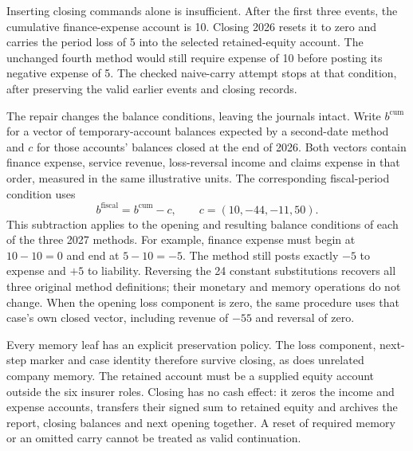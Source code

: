 Inserting closing commands alone is insufficient. After the first three
events, the cumulative finance-expense account is 10. Closing 2026 resets it
to zero and carries the period loss of 5 into the selected retained-equity
account. The unchanged fourth method would still require expense of 10 before
posting its negative expense of 5. The checked naive-carry attempt stops at
that condition, after preserving the valid earlier events and closing records.

The repair changes the balance conditions, leaving the journals intact. Write
$b^{\mathrm{cum}}$ for a vector of temporary-account balances expected by a
second-date method and $c$ for those accounts' balances closed at the end of
2026. Both vectors contain finance expense, service revenue, loss-reversal
income and claims expense in that order, measured in the same illustrative
units. The corresponding fiscal-period condition uses
\[
 b^{\mathrm{fiscal}}=b^{\mathrm{cum}}-c,
 \qquad c=(10,-44,-11,50).
\]
This subtraction applies to the opening and resulting balance conditions of
each of the three 2027 methods. For example, finance expense must begin at
$10-10=0$ and end at $5-10=-5$. The method still posts exactly $-5$ to expense
and $+5$ to liability. Reversing the 24 constant substitutions recovers all
three original method definitions; their monetary and memory operations do
not change. When the opening loss component is zero, the same procedure uses
that case's own closed vector, including revenue of $-55$ and reversal of zero.

Every memory leaf has an explicit preservation policy. The loss component,
next-step marker and case identity therefore survive closing, as does unrelated
company memory. The retained account must be a supplied equity account outside
the six insurer roles. Closing has no cash effect: it zeros the income and
expense accounts, transfers their signed sum to retained equity and archives
the report, closing balances and next opening together. A reset of required
memory or an omitted carry cannot be treated as valid continuation.

